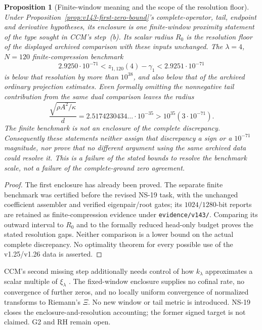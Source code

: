 \documentclass[11pt]{article}
\newtheorem{proposition}[theorem]{Proposition}
\theoremstyle{remark}
\begin{document}
\begin{proposition}[Finite-window meaning and the scope of the resolution floor]
\label{prop:v143-fixed-window-meaning}
Under Proposition~\ref{prop:v143-first-zero-bound}'s complete-operator,
tail, endpoint and derivative hypotheses, its enclosure is one
finite-window proximity statement of the type sought in CCM's
step~(b). Its scalar radius $R_0$ is the resolution floor of the
\emph{displayed archived comparison with these inputs unchanged}.
The $\lambda=4$, $N=120$ finite-compression benchmark
\[
 2.9250\cdot10^{-71}<z_{1,120}(4)-\gamma_1
                         <2.9251\cdot10^{-71}
\]
is below that resolution by more than $10^{38}$, and also below
that of the archived ordinary projection estimates. Even formally
omitting the nonnegative tail contribution from the same dual
comparison leaves the radius
\[
 \frac{\sqrt{\rho A^2/\kappa}}d
 =2.5174230434\ldots\cdot10^{-35}>10^{35}(3\cdot10^{-71}).
\]
The finite benchmark is not an enclosure of the complete discrepancy.
Consequently these statements neither assign that discrepancy a sign
or a $10^{-71}$ magnitude, nor prove that no different argument using
the same archived data could resolve it. This is a failure of the
stated bounds to resolve the benchmark scale, not a failure of the
complete-ground zero agreement.
\end{proposition}
\begin{proof}
The first enclosure has already been proved. The separate finite
benchmark was certified before the revised NS-19 task, with the
unchanged coefficient assembler and verified eigenpair/root gates;
its $1024/1280$-bit reports are retained as finite-compression evidence
under \texttt{evidence/v143/}. Comparing its outward interval to
$R_0$ and to the formally reduced head-only budget proves the
stated resolution gaps. Neither comparison is a lower bound on the
actual complete discrepancy. No optimality theorem for every
possible use of the v1.25/v1.26 data is asserted.
\end{proof}

CCM's second missing step additionally needs control of how
$k_\lambda$ approximates a scalar multiple of $\xi_\lambda$
\cite[Section 8]{ConnesConsaniMoscovici2025}. The fixed-window
enclosure supplies no cofinal rate, no convergence of further zeros,
and no locally uniform convergence of normalized transforms to
Riemann's $\Xi$. No new window or tail metric is introduced.
NS-19 closes the enclosure-and-resolution accounting; the former
signed target is not claimed. G2 and RH remain open.
\end{document}
